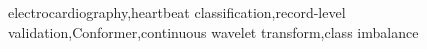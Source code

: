 electrocardiography\sep heartbeat classification\sep record-level validation\sep Conformer\sep continuous wavelet transform\sep class imbalance
